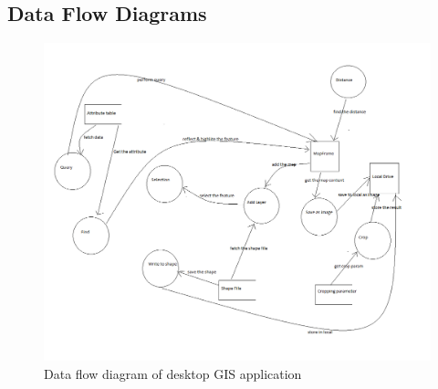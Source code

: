 \subsection{Data Flow Diagrams}
\begin{figure}[h]
\begin{center}
  \includegraphics [scale=0.43] {DataFlow.png}
  \caption[Data Flow Diagram]{Data flow diagram of desktop GIS application}
\end{center}
\end{figure}
